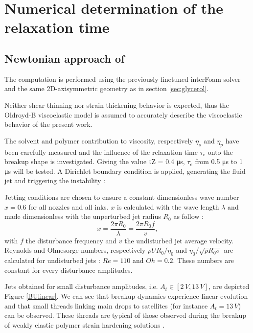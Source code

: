 \documentclass[twocolumn,10pt]{asme2ej}
\begin{document}
\section{Numerical determination of the relaxation time} \label{numericalDetermination}
\subsection{Newtonian approach of }
The computation is performed using the previously finetuned interFoam solver and the same 2D-axisymmetric geometry as in section \ref{sec:glycerol}. 






Neither shear thinning nor strain thickening behavior is expected, thus the Oldroyd-B viscoelastic model \cite{oldroyd1950formulation} is assumed to accurately describe the viscoelastic behavior of the present work. 

The solvent and polymer contribution to viscosity, respectively $\eta_s$ and $\eta_p$ have been carefully measured and the influence of the relaxation time $\tau_e$ onto the breakup shape is investigated. Giving the value τZ = 0.4 μs, $\tau_e$ from 0.5 μs to 1 μs will be tested. A Dirichlet boundary condition is applied, generating the fluid jet and triggering the instability :


Jetting conditions are chosen to ensure a constant dimensionless wave number $x=0.6$ for all nozzles and all inks. $x$ is calculated with the wave length $\lambda$ and made dimensionless with the unperturbed jet radius $R_0$ as follow :
\begin{equation}
  x=\frac{2 \pi R_0}{\lambda}=\frac{2 \pi R_0 f}{v},
\end{equation} 
with $f$ the disturbance frequency and $v$ the undisturbed jet average velocity. Reynolds and Ohnesorge numbers, respectively $\rho U R_0 / \eta_0$ and $\eta_0/\sqrt{\rho R_0 \sigma}$ are calculated for undisturbed jets : $Re=110$ and $Oh=0.2$. These numbers are constant for every disturbance amplitudes.

Jets obtained for small disturbance amplitudes, i.e. $A_t \in [2 \, V,13 \, V]$, are  depicted Figure \ref{BUlinear}. We can see that breakup dynamics experience linear evolution and that small threads linking main drops to satellites (for instance $A_t = 13 \, V$) can be observed. These threads are typical of those observed during the breakup of weakly elastic polymer strain hardening solutions \cite{christanti2002effect}.
\end{document}
